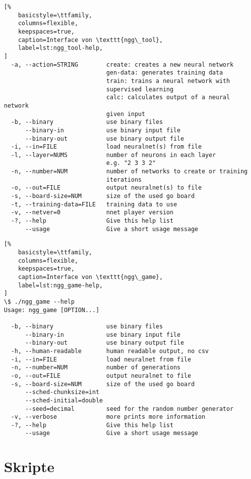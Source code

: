 \begin{appendices}
\begin{lstlisting}[%
    basicstyle=\ttfamily,
    columns=flexible,
    keepspaces=true,
    caption=Interface von \texttt{ngg\_tool},
    label=lst:ngg_tool-help,
]
  -a, --action=STRING        create: creates a new neural network
                             gen-data: generates training data
                             train: trains a neural network with
                             supervised learning
                             calc: calculates output of a neural network
                             given input
  -b, --binary               use binary files
      --binary-in            use binary input file
      --binary-out           use binary output file
  -i, --in=FILE              load neuralnet(s) from file
  -l, --layer=NUMS           number of neurons in each layer
                             e.g. "2 3 3 2"
  -n, --number=NUM           number of networks to create or training
                             iterations
  -o, --out=FILE             output neuralnet(s) to file
  -s, --board-size=NUM       size of the used go board
  -t, --training-data=FILE   training data to use
  -v, --netver=0             nnet player version
  -?, --help                 Give this help list
      --usage                Give a short usage message
\end{lstlisting}

\begin{lstlisting}[%
    basicstyle=\ttfamily,
    columns=flexible,
    keepspaces=true,
    caption=Interface von \texttt{ngg\_game},
    label=lst:ngg_game-help,
]
\$ ./ngg_game --help
Usage: ngg_game [OPTION...]

  -b, --binary               use binary files
      --binary-in            use binary input file
      --binary-out           use binary output file
  -h, --human-readable       human readable output, no csv
  -i, --in=FILE              load neuralnet from file
  -n, --number=NUM           number of generations
  -o, --out=FILE             output neuralnet to file
  -s, --board-size=NUM       size of the used go board
      --sched-chunksize=int
      --sched-initial=double
      --seed=decimal         seed for the random number generator
  -v, --verbose              more prints more information
  -?, --help                 Give this help list
      --usage                Give a short usage message
\end{lstlisting}


\section{Skripte}




\end{appendices}
